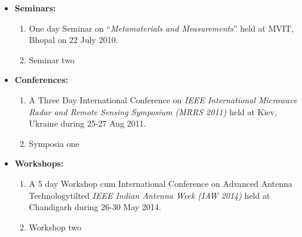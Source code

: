 \begin{itemize}
	\item \textbf{Seminars: }
	\begin{enumerate}
		\item One day Seminar on “\textit{Metamaterials  and Measurements}” held at MVIT,  Bhopal on 22 July 2010.
		\item Seminar two
	\end{enumerate}
	\item \textbf{Conferences:}
	\begin{enumerate}
		\item A Three Day International Conference on \textit{IEEE International Microwave Radar and Remote Sensing Symposium (MRRS 2011)} held at Kiev, Ukraine during 25-27 Aug 2011.
		\item Symposia one
	\end{enumerate}
	\item \textbf{Workshops:}
	\begin{enumerate}
		\item A 5 day Workshop cum International Conference on Advanced Antenna Technologytilted \textit{IEEE Indian Antenna Week (IAW 2014)} held at Chandigarh during 26-30 May 2014.
		\item Workshop two
	\end{enumerate}
\end{itemize}



